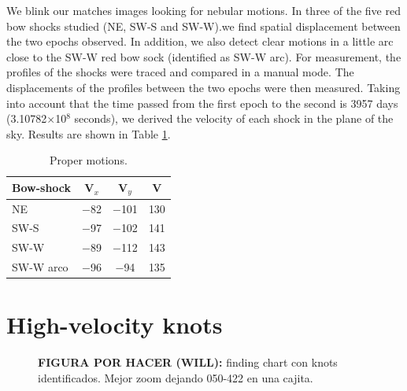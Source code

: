 \documentclass[a4paper,fleqn,usenatbib]{mnras}     %
\begin{document}
We blink our matches images looking for nebular motions. In three of the five red bow shocks studied (NE, SW-S and SW-W).we find spatial 
displacement between the two epochs observed. In addition, we also detect clear motions in a little arc close to the SW-W red bow sock 
(identified as SW-W arc). For measurement, the profiles of the shocks were traced and compared in a manual mode. The displacements of 
the profiles between the two epochs were then measured. Taking into account that the time passed from the first epoch to the second is 
3957 days (3.10782$\times$10$^8$ seconds), we derived the velocity of each shock in the plane of the sky. Results are shown in Table \ref{table:propermotions}.




\begin{table}
\caption{Proper motions.} 
\label{table:propermotions} 
\centering 
\begin{tabular}{l c c c }
\hline

Bow-shock	&  V$_x$	&   V$_y$    	& V      \\
\hline
NE		&  $-$82	&  $-$101    	&  130   \\
SW-S		&  $-$97	&  $-$102    	&  141   \\
SW-W		&  $-$89	&  $-$112    	&  143   \\
SW-W arco	&  $-$96	&  $-$94	&  135   \\
\hline
\end{tabular}
\end{table}






\section{High-velocity knots}\label{sec:knots}

\begin{figure}
    \caption{\textbf{FIGURA POR HACER (WILL):} finding chart con knots identificados. Mejor zoom dejando 050-422 en una cajita.}  
    \label{fig:blue_features}
\end{figure}
\end{document}
